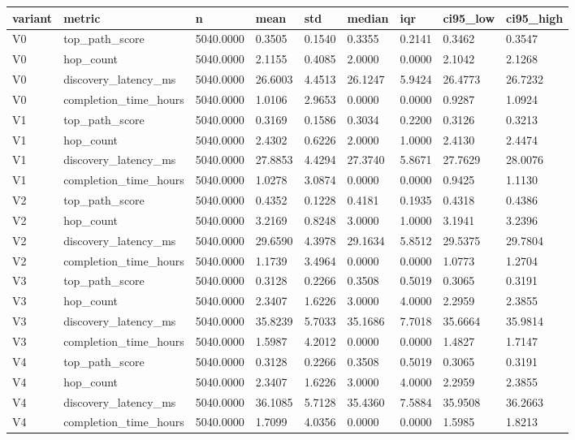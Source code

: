 \begin{tabular}{lllllllll}
\toprule
variant & metric & n & mean & std & median & iqr & ci95_low & ci95_high \\
\midrule
V0 & top_path_score & 5040.0000 & 0.3505 & 0.1540 & 0.3355 & 0.2141 & 0.3462 & 0.3547 \\
V0 & hop_count & 5040.0000 & 2.1155 & 0.4085 & 2.0000 & 0.0000 & 2.1042 & 2.1268 \\
V0 & discovery_latency_ms & 5040.0000 & 26.6003 & 4.4513 & 26.1247 & 5.9424 & 26.4773 & 26.7232 \\
V0 & completion_time_hours & 5040.0000 & 1.0106 & 2.9653 & 0.0000 & 0.0000 & 0.9287 & 1.0924 \\
V1 & top_path_score & 5040.0000 & 0.3169 & 0.1586 & 0.3034 & 0.2200 & 0.3126 & 0.3213 \\
V1 & hop_count & 5040.0000 & 2.4302 & 0.6226 & 2.0000 & 1.0000 & 2.4130 & 2.4474 \\
V1 & discovery_latency_ms & 5040.0000 & 27.8853 & 4.4294 & 27.3740 & 5.8671 & 27.7629 & 28.0076 \\
V1 & completion_time_hours & 5040.0000 & 1.0278 & 3.0874 & 0.0000 & 0.0000 & 0.9425 & 1.1130 \\
V2 & top_path_score & 5040.0000 & 0.4352 & 0.1228 & 0.4181 & 0.1935 & 0.4318 & 0.4386 \\
V2 & hop_count & 5040.0000 & 3.2169 & 0.8248 & 3.0000 & 1.0000 & 3.1941 & 3.2396 \\
V2 & discovery_latency_ms & 5040.0000 & 29.6590 & 4.3978 & 29.1634 & 5.8512 & 29.5375 & 29.7804 \\
V2 & completion_time_hours & 5040.0000 & 1.1739 & 3.4964 & 0.0000 & 0.0000 & 1.0773 & 1.2704 \\
V3 & top_path_score & 5040.0000 & 0.3128 & 0.2266 & 0.3508 & 0.5019 & 0.3065 & 0.3191 \\
V3 & hop_count & 5040.0000 & 2.3407 & 1.6226 & 3.0000 & 4.0000 & 2.2959 & 2.3855 \\
V3 & discovery_latency_ms & 5040.0000 & 35.8239 & 5.7033 & 35.1686 & 7.7018 & 35.6664 & 35.9814 \\
V3 & completion_time_hours & 5040.0000 & 1.5987 & 4.2012 & 0.0000 & 0.0000 & 1.4827 & 1.7147 \\
V4 & top_path_score & 5040.0000 & 0.3128 & 0.2266 & 0.3508 & 0.5019 & 0.3065 & 0.3191 \\
V4 & hop_count & 5040.0000 & 2.3407 & 1.6226 & 3.0000 & 4.0000 & 2.2959 & 2.3855 \\
V4 & discovery_latency_ms & 5040.0000 & 36.1085 & 5.7128 & 35.4360 & 7.5884 & 35.9508 & 36.2663 \\
V4 & completion_time_hours & 5040.0000 & 1.7099 & 4.0356 & 0.0000 & 0.0000 & 1.5985 & 1.8213 \\
\bottomrule
\end{tabular}
